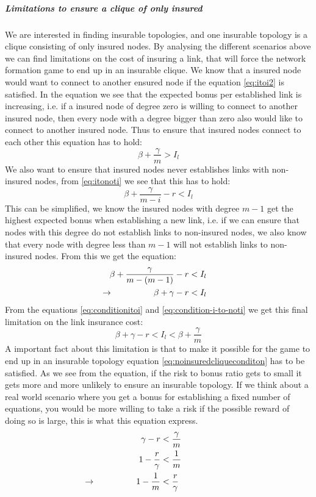 \subparagraph{Limitations to ensure a clique of only insured}
We are interested in finding insurable topologies, and one insurable topology is a clique consisting of only insured nodes. By analysing the different scenarios above we can find limitations on the cost of insuring a link, that will force the network formation game to end up in an insurable clique.
We know that a insured node would want to connect to another ensured node if the equation \ref{eq:itoi2} is satisfied. 
In the equation we see that the expected bonus per established link is increasing, i.e. if a insured node of degree zero is willing to connect to another insured node, then every node with a degree bigger than zero also would like to connect to another insured node. Thus to ensure that insured nodes connect to each other this equation has to hold:
\[
\beta+\frac{\gamma}{m}>I_{l}
\label{eq:conditionitoi}
\]
We also want to ensure that insured nodes never establishes links with non-insured nodes, from \ref{eq:itonoti} we see that this has to hold:
\[
\beta+\frac{\gamma}{m-i}-r < I_{l}
\]
This can be simplified, we know the insured nodes with degree $m-1$ get the highest expected bonus when establishing a new link, i.e. if we can ensure that nodes with this degree do not establish links to non-insured nodes, we also know that every node with degree less than $m-1$ will not establish links to non-insured nodes. From this we get the equation:
\begin{eqnarray}
\beta+\frac{\gamma}{m-(m-1)}-r&<I_{l} \nonumber\\
\llap{$\rightarrow$\hspace{50pt}} \beta+\gamma-r&<I_{l}
\label{eq:condition-i-to-noti}
\end{eqnarray}
From the equations \ref{eq:conditionitoi} and \ref{eq:condition-i-to-noti} we get this final limitation on the link insurance cost:
\begin{equation}
\beta+\gamma-r<I_{l}<\beta+\frac{\gamma}{m}
\label{eq:final-insurance-clique-condition}
\end{equation}
A important fact about this limitation is that to make it possible for the game to end up in an insurable topology equation \ref{eq:noinsuredcliqueconditon} has to be satisfied. As we see from the equation, if the risk to bonus ratio gets to small it gets more and more unlikely to ensure an insurable topology. If we think about a real world scenario where you get a bonus for establishing a fixed number of equations, you would be more willing to take a risk if the possible reward of doing so is large, this is what this equation express. 
\begin{eqnarray}
\gamma-r &<\frac{\gamma}{m}\nonumber \\
1-\frac{r}{\gamma}&<\frac{1}{m} \nonumber \\
\llap{$\rightarrow$\hspace{50pt}}1-\frac{1}{m}&<\frac{r}{\gamma}
\label{eq:noinsuredcliqueconditon}
\end{eqnarray}

